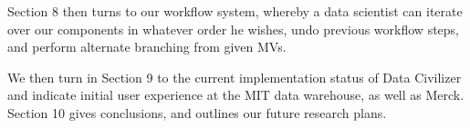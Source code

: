 Section 8 then turns to our workflow system, whereby a data scientist can
iterate over our components in whatever order he wishes, undo previous workflow
steps, and perform alternate branching from given MVs. 

We then turn in Section 9 to the current implementation status of Data Civilizer
and indicate initial user experience at the MIT data warehouse, as well as
Merck.  Section 10 gives conclusions, and outlines our future research plans.

